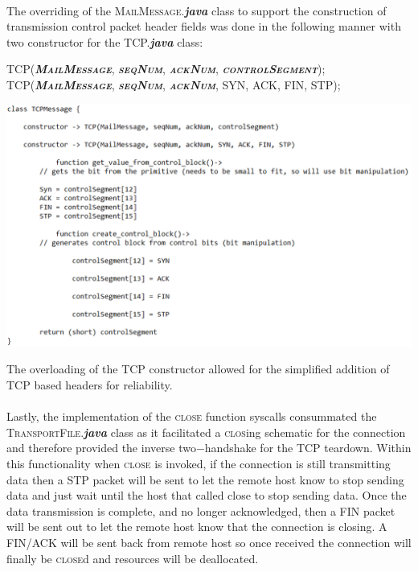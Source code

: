 \documentclass[12pt]{article}
\begin{document}
{    \paragraph{} The overriding of the \textsc{MailMessage}.\textbf{\textit{java}} class to support the construction of transmission control packet header fields was done in the following manner with two constructor for the TCP.\textbf{\textit{java}} class:
    \begin{center} \textsc{TCP(\textbf{\textit{MailMessage}}, \textbf{\textit{seqNum}}, \textbf{\textit{ackNum}}, \textbf{\textit{controlSegment}});} \\ \textsc{TCP(\textbf{\textit{MailMessage}}, \textbf{\textit{seqNum}}, \textbf{\textit{ackNum}}, SYN, ACK, FIN, STP)}; \end{center}
    \begin{center} \includegraphics[width=150mm]{task1D.png} \end{center}
    The overloading of the TCP constructor allowed for the simplified addition of TCP based headers for reliability. 
    \paragraph{} Lastly, the implementation of the \textsc{close} function syscalls consummated the \textsc{TransportFile}.\textbf{\textit{java}} class
    as it facilitated a \textsc{clos}ing schematic for the connection and therefore provided the inverse two$-$handshake for the TCP teardown. Within this functionality
    when \textsc{close} is invoked, if the connection is still transmitting data then a \textsc{STP} packet will be sent to let the remote host know to stop sending data and just wait until the host that called close to stop sending data. 
    Once the data transmission is complete, and no longer acknowledged, then a \textsc{FIN} packet will be sent out to let the remote host know that the connection is closing. A \textsc{FIN}/\textsc{ACK} will be sent back from remote host so once received the connection will finally be \textsc{close}d and resources will be deallocated.  
}
\end{document}
